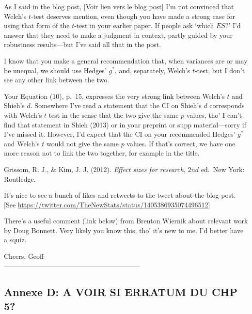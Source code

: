\documentclass[
  12pt,
  french,
]{article}
\begin{document}
\color{brown} As I said in the blog post, \color{darkgray} {[}Voir lien
vers le blog post{]} \color{brown} I'm not convinced that Welch's
\(t\)-test deserves mention, even though you have made a strong case for
using that form of the \(t\)-test in your earlier paper. If people ask
`which \(ES\)?' I'd answer that they need to make a judgment in context,
partly guided by your robustness results---but I've said all that in the
post.

I know that you make a general recommendation that, when variances are
or may be unequal, we should use Hedges' \(g^*\), and, separately,
Welch's \(t\)-test, but I don't see any other link between the two.

Your Equation (10), p.~15, expresses the very strong link between
Welch's \(t\) and Shieh's \(d\). Somewhere I've read a statement that
the CI on Shieh's \(d\) corresponds with Welch's \(t\) test in the sense
that the two give the same \(p\) values, tho' I can't find that
statement in Shieh (2013) or in your preprint or supp material---sorry
if I've missed it. However, I'd expect that the CI on your recommended
Hedges' \(g^*\) and Welch's \(t\) would not give the same \(p\) values.
If that's correct, we have one more reason not to link the two together,
for example in the title.

\color{black} Grissom, R. J., \& Kim, J. J. (2012). \emph{Effect sizes
for research}, \(2{nd}\) ed.~New York: Routledge.

\color{brown} It's nice to see a bunch of likes and retweets to the
tweet about the blog post. \color{darkgray} {[}See
\underline{https://twitter.com/TheNewStats/status/1405386935074496512}{]}

\color{brown} There's a useful comment (link below) from Brenton Wiernik
about relevant work by Doug Bonnett. Very likely you know this, tho'
it's new to me. I'd better have a squiz.

Cheers, Geoff\\
\color{black}
------------------------------------------------------------

\newpage

\hypertarget{annexe-d-a-voir-si-erratum-du-chp-5}{%
\subsection{Annexe D: A VOIR SI ERRATUM DU CHP
5?}\label{annexe-d-a-voir-si-erratum-du-chp-5}}
\end{document}
